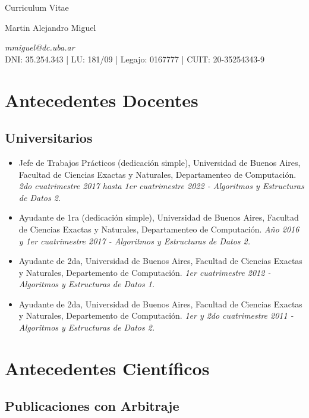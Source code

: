 \documentclass[a4paper,10pt]{article}
\begin{document}
\begin{center}
    { \Huge
    Curriculum Vitae}
\bigskip

{\Large Martin Alejandro Miguel} \\
\medskip

\emph{mmiguel@dc.uba.ar} \\
DNI: 35.254.343 | LU: 181/09 | Legajo: 0167777 | CUIT: 20-35254343-9
\end{center}


\section{Antecedentes Docentes}

\subsection{Universitarios}

\begin{itemize}
    \item Jefe de Trabajos Prácticos (dedicación simple), Universidad de Buenos
        Aires, Facultad de Ciencias Exactas y Naturales, Departamenteo de
        Computación. \emph{2do cuatrimestre 2017 hasta 1er cuatrimestre 2022 -
        Algoritmos y Estructuras de Datos 2.}
    \item Ayudante de 1ra (dedicación simple), Universidad de Buenos Aires,
        Facultad de Ciencias Exactas y Naturales, Departamenteo de Computación.
        \emph{Año 2016 y 1er cuatrimestre 2017 - Algoritmos y Estructuras de
        Datos 2.}
    \item Ayudante de 2da, Universidad de Buenos Aires, Facultad de Ciencias
        Exactas y Naturales, Departemento de Computación. \emph{1er
        cuatrimestre 2012 - Algoritmos y Estructuras de Datos 1.}
    \item Ayudante de 2da, Universidad de Buenos Aires, Facultad de Ciencias
        Exactas y Naturales, Departemento de Computación. \emph{1er y 2do
        cuatrimestre 2011 - Algoritmos y Estructuras de Datos 2.}
\end{itemize}

\section{Antecedentes Científicos}

\subsection{Publicaciones con Arbitraje}
\end{document}
